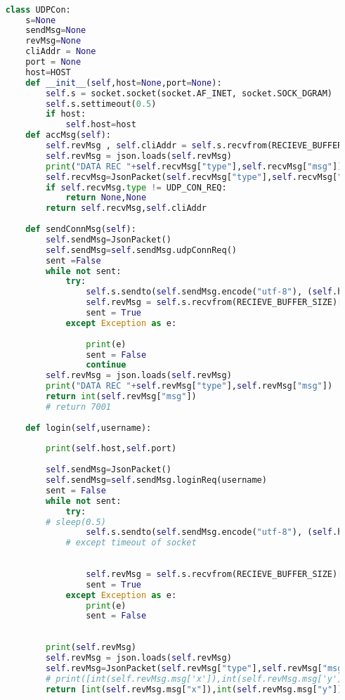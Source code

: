 \begin{lstlisting}[language=Python]

    class UDPCon:
        s=None
        sendMsg=None
        revMsg=None
        cliAddr = None
        port = None
        host=HOST
        def __init__(self,host=None,port=None):
            self.s = socket.socket(socket.AF_INET, socket.SOCK_DGRAM)
            self.s.settimeout(0.5)
            if host:
                self.host=host
        def accMsg(self):
            self.revMsg , self.cliAddr = self.s.recvfrom(RECIEVE_BUFFER_SIZE)
            self.revMsg = json.loads(self.revMsg)
            print("DATA REC "+self.recvMsg["type"],self.recvMsg["msg"])
            self.recvMsg=JsonPacket(self.recvMsg["type"],self.recvMsg["msg"])
            if self.recvMsg.type != UDP_CON_REQ:
                return None,None
            return self.recvMsg,self.cliAddr
    
        def sendConnMsg(self):
            self.sendMsg=JsonPacket()
            self.sendMsg=self.sendMsg.udpConnReq()
            sent =False
            while not sent:
                try:
                    self.s.sendto(self.sendMsg.encode("utf-8"), (self.host,PORT))
                    self.revMsg = self.s.recvfrom(RECIEVE_BUFFER_SIZE)[0]
                    sent = True
                except Exception as e:
    
                    print(e)
                    sent = False
                    continue
            self.revMsg = json.loads(self.revMsg)
            print("DATA REC "+self.revMsg["type"],self.revMsg["msg"])
            return int(self.revMsg["msg"])
            # return 7001
    
        def login(self,username):
            
            print(self.host,self.port)
    
            self.sendMsg=JsonPacket()
            self.sendMsg=self.sendMsg.loginReq(username)
            sent = False
            while not sent:
                try:
            # sleep(0.5)
                    self.s.sendto(self.sendMsg.encode("utf-8"), (self.host,self.port))
                # except timeout of socket
                    
            
                    self.revMsg = self.s.recvfrom(RECIEVE_BUFFER_SIZE)[0]
                    sent = True
                except Exception as e:
                    print(e)
                    sent = False
    
    
            print(self.revMsg)
            self.revMsg = json.loads(self.revMsg)
            self.revMsg=JsonPacket(self.revMsg["type"],self.revMsg["msg"])
            # print([int(self.revMsg.msg['x']),int(self.revMsg.msg['y']),int(self.revMsg.msg['id'])])
            return [int(self.revMsg.msg["x"]),int(self.revMsg.msg["y"]),int(self.revMsg.msg["id"])]
            

\end{lstlisting}
